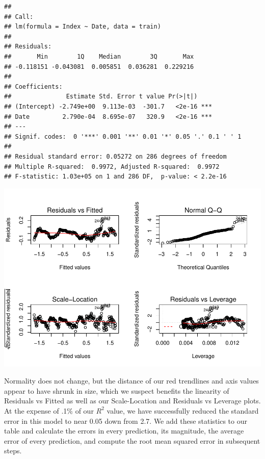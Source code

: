 \documentclass[
]{article}
\begin{document}
\begin{verbatim}
## 
## Call:
## lm(formula = Index ~ Date, data = train)
## 
## Residuals:
##       Min        1Q    Median        3Q       Max 
## -0.118151 -0.043081  0.005851  0.036281  0.229216 
## 
## Coefficients:
##               Estimate Std. Error t value Pr(>|t|)    
## (Intercept) -2.749e+00  9.113e-03  -301.7   <2e-16 ***
## Date         2.790e-04  8.695e-07   320.9   <2e-16 ***
## ---
## Signif. codes:  0 '***' 0.001 '**' 0.01 '*' 0.05 '.' 0.1 ' ' 1
## 
## Residual standard error: 0.05272 on 286 degrees of freedom
## Multiple R-squared:  0.9972, Adjusted R-squared:  0.9972 
## F-statistic: 1.03e+05 on 1 and 286 DF,  p-value: < 2.2e-16
\end{verbatim}

\includegraphics{CPIAnalysis_files/figure-latex/unnamed-chunk-10-1.pdf}

Normality does not change, but the distance of our red trendlines and
axis values appear to have shrunk in size, which we suspect benefits the
linearity of Residuals vs Fitted as well as our Scale-Location and
Residuals vs Leverage plots. At the expense of .1\% of our \(R^2\)
value, we have successfully reduced the standard error in this model to
near 0.05 down from 2.7. We add these statistics to our table and
calculate the errors in every prediction, its magnitude, the average
error of every prediction, and compute the root mean squared error in
subsequent steps.
\end{document}
